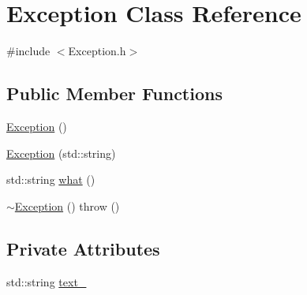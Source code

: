 \hypertarget{classException}{\section{\-Exception \-Class \-Reference}
\label{d4/d67/classException}
}


{\ttfamily \#include $<$\-Exception.\-h$>$}

\subsection*{\-Public \-Member \-Functions}
\begin{DoxyCompactItemize}
\item 
\hyperlink{classException_a1b78336bb26edf8e784783cc150c5801}{\-Exception} ()
\item 
\hyperlink{classException_a63246c90246de105568d97b0164954d8}{\-Exception} (std\-::string)
\item 
std\-::string \hyperlink{classException_ae40b22a7b2471b142d861bc33b51a820}{what} ()
\item 
\hyperlink{classException_a6b214cd8627d0968bdeebc1fbb9556b8}{$\sim$\-Exception} ()  throw ()
\end{DoxyCompactItemize}
\subsection*{\-Private \-Attributes}
\begin{DoxyCompactItemize}
\item 
std\-::string \hyperlink{classException_a404e79b557f64d95acfb5dccbb864860}{text\-\_\-}
\end{DoxyCompactItemize}


